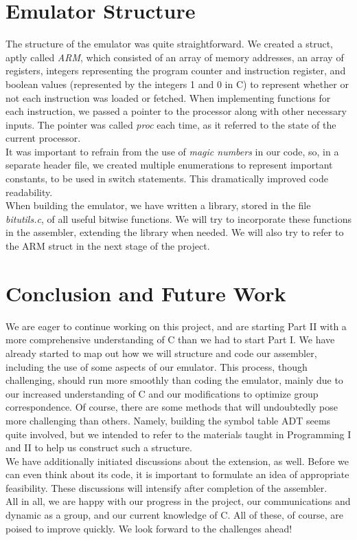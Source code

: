 \documentclass[11pt]{article}
\begin{document}
\section{Emulator Structure}

The structure of the emulator was quite straightforward. We created a struct, aptly called \emph{ARM}, which consisted of an array of memory addresses, an array of registers, integers representing the program counter and instruction register, and boolean values (represented by the integers 1 and 0 in C) to represent whether or not each instruction was loaded or fetched. When implementing functions for each instruction, we passed a pointer to the processor along with other necessary inputs. The pointer was called \emph{proc} each time, as it referred to the state of the current processor.\\[0.2in] It was important to refrain from the use of \emph{magic numbers} in our code, so, in a separate header file, we created multiple enumerations to represent important constants, to be used in switch statements. This dramatically improved code readability.\\[0.2in] When building the emulator, we have written a library, stored in the file \emph{bitutils.c},  of all useful bitwise functions. We will try to incorporate these functions in the assembler, extending the library when needed. We will also try to refer to the ARM struct in the next stage of the project. 

\vspace{0.6in}

\section{Conclusion and Future Work}

We are eager to continue working on this project, and are starting Part II with a more comprehensive understanding of C than we had to start Part I. We have already started to map out how we will structure and code our assembler, including the use of some aspects of our emulator. This process, though challenging, should run more smoothly than coding the emulator, mainly due to our increased understanding of C and our modifications to optimize group correspondence. Of course, there are some methods that will undoubtedly pose more challenging than others. Namely, building the symbol table ADT seems quite involved, but we intended to refer to the materials taught in Programming I and II to help us construct such a structure.\\[0.2in] We have additionally initiated discussions about the extension, as well. Before we can even think about its code, it is important to formulate an idea of appropriate feasibility. These discussions will intensify after completion of the assembler.\\[0.2in] All in all, we are happy with our progress in the project, our communications and dynamic as a group, and our current knowledge of C. All of these, of course, are poised to improve quickly. We look forward to the challenges ahead!
\end{document}
